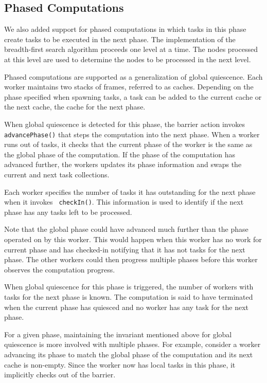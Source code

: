 \documentclass[10pt]{article}
\numberwithin{equation}{section}
\newcommand{\java}{\tt}
\begin{document}
\subsection{Phased Computations}

We also added support for phased computations in which tasks in this
phase create tasks to be executed in the next phase. The
implementation of the breadth-first search algorithm proceeds one
level at a time. The nodes processed at this level are used to
determine the nodes to be processed in the next level.

Phased computations are supported as a generalization of global
quiescence. Each worker maintains two stacks of frames, referred to as
caches. Depending on the phase specified when spawning tasks, a task
can be added to the current cache or the next cache, the cache for the
next phase. 

When global quiescence is detected for this phase, the barrier action
invokes {\java advancePhase()} that steps the computation into the
next phase. When a worker runs out of tasks, it checks that the
current phase of the worker is the same as the global phase of the
computation. If the phase of the computation has advanced further, the
workers updates its phase information and swaps the current and next
task collections. 

Each worker specifies the number of tasks it has
outstanding for the next phase when it invokes {\java
  checkIn()}. This information is used to identify if the next phase
has any tasks left to be processed. 

Note that the global phase could have advanced much further than the
phase operated on by this worker. This would happen when this worker
has no work for current phase and has checked-in notifying that it has
not tasks for the next phase. The other workers could then progress
multiple phases before this worker observes the computation progress. 

When global quiescence for this phase is triggered, the number of
workers with tasks for the next phase is known. The computation is
said to have terminated when the current phase has quiesced and no
worker has any task for the next phase. 

For a given phase, maintaining the invariant mentioned above for
global quiescence is more involved with multiple phases. For example,
consider a worker advancing its phase to match the global phase of the
computation and its next cache is non-empty. Since the worker now has
local tasks in this phase, it implicitly checks out of the barrier.
\end{document}
